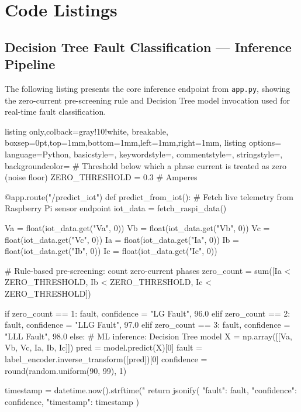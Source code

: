 \chapter{Code Listings}

\section{Decision Tree Fault Classification — Inference Pipeline}

The following listing presents the core inference endpoint from \texttt{app.py}, showing the zero-current pre-screening rule and Decision Tree model invocation used for real-time fault classification.

\begin{tcblisting}{listing only,colback=gray!10!white, breakable, boxsep=0pt,top=1mm,bottom=1mm,left=1mm,right=1mm,
listing options={
language=Python,
basicstyle=\small\ttfamily,
keywordstyle=\color{blue},
commentstyle=\color{gray},
stringstyle=\color{orange},
backgroundcolor=\color{gray!25}}}
# Threshold below which a phase current is treated as zero (noise floor)
ZERO_THRESHOLD = 0.3   # Amperes

@app.route("/predict_iot")
def predict_from_iot():
    # Fetch live telemetry from Raspberry Pi sensor endpoint
    iot_data = fetch_raspi_data()

    Va = float(iot_data.get("Va", 0))
    Vb = float(iot_data.get("Vb", 0))
    Vc = float(iot_data.get("Vc", 0))
    Ia = float(iot_data.get("Ia", 0))
    Ib = float(iot_data.get("Ib", 0))
    Ic = float(iot_data.get("Ic", 0))

    # Rule-based pre-screening: count zero-current phases
    zero_count = sum([Ia < ZERO_THRESHOLD,
                      Ib < ZERO_THRESHOLD,
                      Ic < ZERO_THRESHOLD])

    if zero_count == 1:
        fault, confidence = "LG Fault",  96.0
    elif zero_count == 2:
        fault, confidence = "LLG Fault", 97.0
    elif zero_count == 3:
        fault, confidence = "LLL Fault", 98.0
    else:
        # ML inference: Decision Tree model
        X = np.array([[Va, Vb, Vc, Ia, Ib, Ic]])
        pred = model.predict(X)[0]
        fault = label_encoder.inverse_transform([pred])[0]
        confidence = round(random.uniform(90, 99), 1)

    timestamp = datetime.now().strftime("%
    return jsonify({
        "fault": fault,
        "confidence": confidence,
        "timestamp": timestamp
    })
\end{tcblisting}


